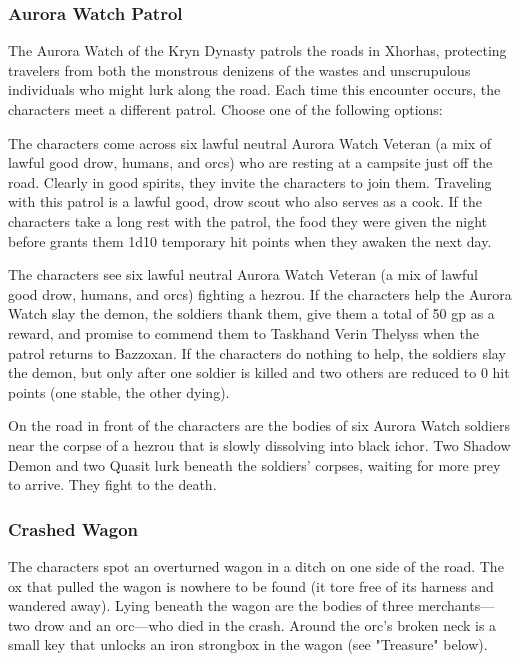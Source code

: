 \documentclass[10pt,a4paper,twoside,bg=print,twocolumn,openany,nodeprecatedcode]{dndbook}
\begin{document}
\subsubsection{Aurora Watch Patrol}
The Aurora Watch of the Kryn Dynasty patrols the roads in Xhorhas, protecting travelers from both the monstrous denizens of the wastes and unscrupulous individuals who might lurk along the road. Each time this encounter occurs, the characters meet a different patrol. Choose one of the following options:


\begin{description}[nolistsep]
\item[Patrol at Rest.]
The characters come across six lawful neutral Aurora Watch Veteran (a mix of lawful good drow, humans, and orcs) who are resting at a campsite just off the road. Clearly in good spirits, they invite the characters to join them. Traveling with this patrol is a lawful good, drow scout who also serves as a cook. If the characters take a long rest with the patrol, the food they were given the night before grants them 1d10 temporary hit points when they awaken the next day.
\item[Patrol in Battle.]
The characters see six lawful neutral Aurora Watch Veteran (a mix of lawful good drow, humans, and orcs) fighting a hezrou. If the characters help the Aurora Watch slay the demon, the soldiers thank them, give them a total of 50 gp as a reward, and promise to commend them to Taskhand Verin Thelyss when the patrol returns to Bazzoxan. If the characters do nothing to help, the soldiers slay the demon, but only after one soldier is killed and two others are reduced to 0 hit points (one stable, the other dying).
\item[Lost Patrol.]
On the road in front of the characters are the bodies of six Aurora Watch soldiers near the corpse of a hezrou that is slowly dissolving into black ichor. Two Shadow Demon and two Quasit lurk beneath the soldiers' corpses, waiting for more prey to arrive. They fight to the death.
\end{description}

\subsubsection{Crashed Wagon}
The characters spot an overturned wagon in a ditch on one side of the road. The ox that pulled the wagon is nowhere to be found (it tore free of its harness and wandered away). Lying beneath the wagon are the bodies of three merchants—two drow and an orc—who died in the crash. Around the orc's broken neck is a small key that unlocks an iron strongbox in the wagon (see "Treasure" below).
\end{document}
